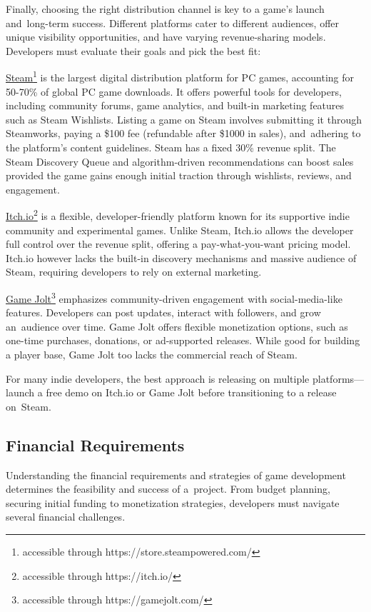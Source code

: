 Finally, choosing the right distribution channel is key to a game’s launch and~long-term success. Different platforms cater to different audiences, offer unique visibility opportunities, and have varying revenue-sharing models. Developers must evaluate their goals and pick the best fit:

 \href{https://store.steampowered.com/}{Steam}\footnote{accessible through https://store.steampowered.com/} is the largest digital distribution platform for PC games, accounting for 50-70\% of global PC game downloads.\cite{zuckerman_steam-statistics} It offers powerful tools for developers, including community forums, game analytics, and built-in marketing features such as Steam Wishlists. Listing a game on Steam involves submitting it through Steamworks, paying a \$100 fee (refundable after \$1000 in sales), and~adhering to the platform’s content guidelines. Steam has a fixed 30\% revenue split. The Steam Discovery Queue and algorithm-driven recommendations can boost sales provided the game gains enough initial traction through wishlists, reviews, and engagement.\cite{steam_wishlist,steam_partner-program,steam_discovery}

 \href{https://itch.io/}{Itch.io}\footnote{accessible through https://itch.io/} is a flexible, developer-friendly platform known for its supportive indie community and experimental games. Unlike Steam, Itch.io allows the developer full control over the revenue split, offering a pay-what-you-want pricing model. Itch.io however lacks the built-in discovery mechanisms and massive audience of Steam, requiring developers to rely on external marketing.\cite{carpenter_creator-day}

 \href{https://gamejolt.com/}{Game Jolt}\footnote{accessible through https://gamejolt.com/} emphasizes community-driven engagement with social-media-like features. Developers can post updates, interact with followers, and grow an~audience over time. Game Jolt offers flexible monetization options, such as one-time purchases, donations, or ad-supported releases. While good for building a player base, Game Jolt too lacks the commercial reach of Steam.\cite{game-jolt_help}

For many indie developers, the best approach is releasing on multiple platforms---launch a free demo on Itch.io or Game Jolt before transitioning to a release on~Steam.

\subsection{Financial Requirements}
Understanding the financial requirements and strategies of game development determines the feasibility and success of a~project. From budget planning, securing initial funding to monetization strategies, developers must navigate several financial challenges.

